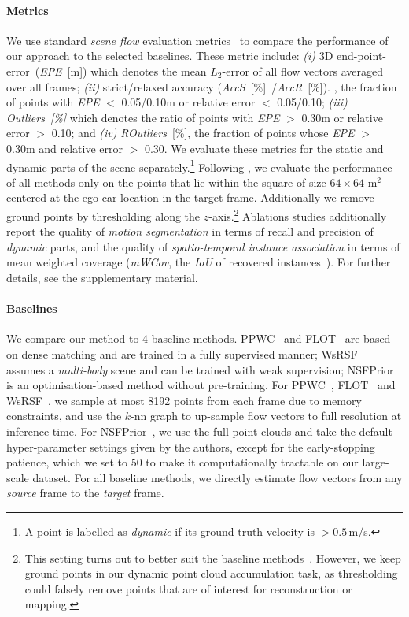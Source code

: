 \paragraph{Metrics}

We use standard \emph{scene flow} evaluation metrics~\cite{liu2019flownet3d,baur2021slim} to compare the performance of our approach to the selected baselines. These metric include:
\textit{(i)} 3D end-point-error~(\textit{EPE}~[m]) which denotes the mean $L_2$-error of all flow vectors averaged over all frames; 
\textit{(ii)} strict/relaxed accuracy (\textit{AccS}~[\%]~/\textit{AccR}~[\%]). \ie, the fraction of points with \textit{EPE} $<$ 0.05/0.10m or relative error $<$ 0.05/0.10; \textit{(iii)} \textit{Outliers~[\%]} which denotes the ratio of points with \textit{EPE} $>$ 0.30m or relative error $>$ 0.10; and \textit{(iv)} \textit{ROutliers}~[\%], the fraction of points whose \textit{EPE} $>$ 0.30m and relative error $>$ 0.30. We evaluate these metrics for the static and dynamic parts of the scene separately.\footnote{A point is labelled as \textit{dynamic} if its ground-truth velocity is $>0.5\,$m/s.} %
Following \cite{wu2020motionnet,luo2021self}, we evaluate the performance of all methods only on the points that lie within the square of size $64\times 64$ m$^2$ centered at the ego-car location in the target frame. Additionally we remove ground points by thresholding along the $z$-axis.\footnote{This setting turns out to better suit the baseline methods~\cite{puy2020flot,wu2019pointpwc,li2021neural}. However, we keep ground points in our dynamic point cloud accumulation task, as thresholding could falsely remove points that are of interest for reconstruction or mapping.} Ablations studies additionally report the quality of \textit{motion segmentation} in terms of recall and precision of \textit{dynamic} parts, and the quality of \textit{spatio-temporal instance association} in terms of mean weighted coverage (\textit{mWCov}, the \textit{IoU} of recovered instances~\cite{wang2019associatively}). For further details, see the supplementary material.

\paragraph{Baselines}
We compare our method to 4 baseline methods. PPWC~\cite{wu2019pointpwc} and FLOT~\cite{puy2020flot} are based on dense matching and are trained in a fully supervised manner; WsRSF~\cite{gojcic2021weakly} assumes a \textit{multi-body} scene and can be trained with weak supervision; NSFPrior~\cite{li2021neural} is an optimisation-based method without pre-training. For PPWC~\cite{wu2019pointpwc}, FLOT~\cite{puy2020flot} and WsRSF~\cite{gojcic2021weakly}, we sample at most 8192 points from each frame due to memory constraints, and use the $k$-nn graph to up-sample flow vectors to full resolution at inference time. For NSFPrior~\cite{li2021neural}, we use the full point clouds and take the default hyper-parameter settings given by the authors, except for the early-stopping patience, which we set to 50 to make it computationally tractable on our large-scale dataset. For all baseline methods, we directly estimate flow vectors from any \textit{source} frame to the \textit{target} frame. 

